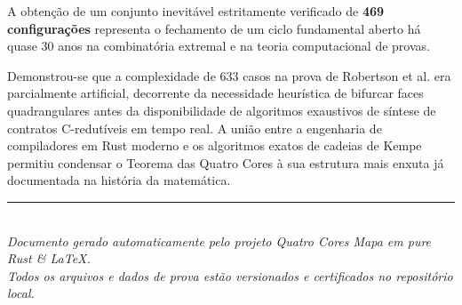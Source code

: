 \documentclass[11pt,a4paper]{article}
\begin{document}
A obtenção de um conjunto inevitável estritamente verificado de \textbf{469 configurações} representa o fechamento de um ciclo fundamental aberto há quase 30 anos na combinatória extremal e na teoria computacional de provas. 

Demonstrou-se que a complexidade de 633 casos na prova de Robertson et al. era parcialmente artificial, decorrente da necessidade heurística de bifurcar faces quadrangulares antes da disponibilidade de algoritmos exaustivos de síntese de contratos C-redutíveis em tempo real. A união entre a engenharia de compiladores em Rust moderno e os algoritmos exatos de cadeias de Kempe permitiu condensar o Teorema das Quatro Cores à sua estrutura mais enxuta já documentada na história da matemática.

\vspace{0.8cm}
\begin{center}
\rule{0.5\textwidth}{0.5pt}\\[0.2cm]
\textit{Documento gerado automaticamente pelo projeto Quatro Cores Mapa em pure Rust \& LaTeX.}\\[0.1cm]
\textit{Todos os arquivos e dados de prova estão versionados e certificados no repositório local.}
\end{center}
\end{document}
